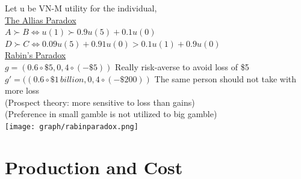 \documentclass[letterpaper,13pt,single,pdftex]{scrartcl}
\begin{document}
Let u be VN-M utility for the individual, \\
\underline{The Allias Paradox}\\
$A\succ B\Leftrightarrow u(1) \succ 0.9 u(5) +0.1 u(0)$\\
$D \succ C \Leftrightarrow 0.09 u(5) + 0.91 u(0) > 0.1 u(1) +0.9 u(0)$\\
\underline{Rabin's Paradox}\\
$g = (0.6\circ \$5, 0,4 \circ (-\$5))$ Really risk-averse to avoid loss of \$5\\
$g'= ((0.6\circ \$1 \,billion, 0,4 \circ (-\$200))$ The same person should not take  with more loss\\
(Prospect theory: more sensitive to loss than gains)\\
(Preference in small gamble is not utilized to big gamble)\\
\texttt{[image: graph/rabinparadox.png]}
\newpage
\section{Production and Cost}
\end{document}
